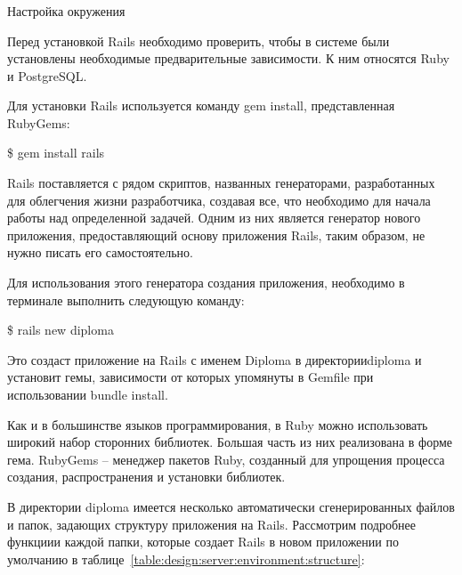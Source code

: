 \subsubsection{} Настройка окружения
\label{sec:design:server:environment}

Перед установкой Rails необходимо проверить, чтобы в системе были установлены необходимые предварительные зависимости.
К ним относятся Ruby и PostgreSQL.

Для установки Rails используется команду gem install, представленная RubyGems:

\begin{flushleft}
  \qquad\qquad\qquad \$ gem install rails
\end{flushleft}

Rails поставляется с рядом скриптов, названных генераторами, разработанных для облегчения жизни разработчика, создавая
все, что необходимо для начала работы над определенной задачей. Одним из них является генератор нового приложения,
предоставляющий основу приложения Rails, таким образом, не нужно писать его самостоятельно.

Для использования этого генератора создания приложения, необходимо в терминале выполнить следующую команду:

\begin{flushleft}
  \qquad\qquad\qquad \$ rails new diploma
\end{flushleft}

Это создаст приложение на Rails с именем Diploma в директории\linebreak diploma и установит гемы, зависимости от которых
упомянуты в Gemfile при использовании bundle install.

Как и в большинстве языков программирования, в Ruby можно использовать широкий набор сторонних библиотек.
Большая часть из них реализована в форме гема. RubyGems -- менеджер пакетов Ruby, созданный для упрощения процесса
создания, распространения и установки библиотек.

В директории diploma имеется несколько автоматически сгенерированных файлов и папок, задающих структуру приложения
на Rails. Рассмотрим подробнее функциии каждой папки, которые создает Rails в новом приложении по умолчанию в
таблице~\ref{table:design:server:environment:structure}:

